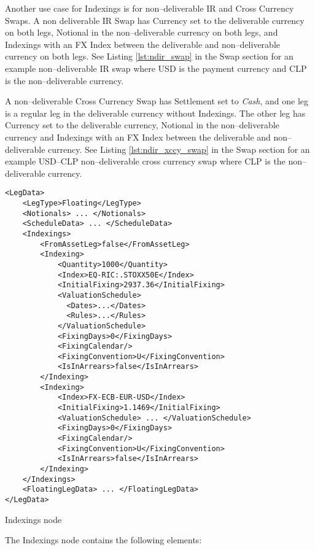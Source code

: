 Another use case for Indexings is for non–deliverable IR and Cross Currency Swaps. A non deliverable IR Swap has Currency set to the deliverable currency on both legs, Notional in the non–deliverable currency on both legs, and Indexings with an FX Index between the deliverable and non–deliverable currency on both legs. See Listing \ref{lst:ndir_swap} in the Swap section for an example non–deliverable IR swap where USD is the payment currency and CLP is the non–deliverable currency.

A non–deliverable Cross Currency Swap has Settlement set to \emph{Cash}, and one leg is a regular leg in the deliverable currency without Indexings. The other leg has Currency set to the deliverable currency, Notional in the non–deliverable currency and Indexings with an FX Index between the deliverable and non–deliverable currency. See Listing \ref{lst:ndir_xccy_swap} in the Swap section for an example USD–CLP non–deliverable cross currency swap where CLP is the non–deliverable currency.

\begin{listing}[H]
\begin{verbatim}
<LegData>
    <LegType>Floating</LegType>
    <Notionals> ... </Notionals>
    <ScheduleData> ... </ScheduleData>
    <Indexings>
        <FromAssetLeg>false</FromAssetLeg>
        <Indexing>
            <Quantity>1000</Quantity>
            <Index>EQ-RIC:.STOXX50E</Index>
            <InitialFixing>2937.36</InitialFixing>
            <ValuationSchedule>
              <Dates>...</Dates>
              <Rules>...</Rules>
            </ValuationSchedule>
            <FixingDays>0</FixingDays>
            <FixingCalendar/>
            <FixingConvention>U</FixingConvention>
            <IsInArrears>false</IsInArrears>
        </Indexing>
        <Indexing>
            <Index>FX-ECB-EUR-USD</Index>
            <InitialFixing>1.1469</InitialFixing>
            <ValuationSchedule> ... </ValuationSchedule>
            <FixingDays>0</FixingDays>
            <FixingCalendar/>
            <FixingConvention>U</FixingConvention>
            <IsInArrears>false</IsInArrears>
        </Indexing>
    </Indexings>
    <FloatingLegData> ... </FloatingLegData>
</LegData>
\end{verbatim}
\caption{Indexings node}
\label{lst:indexings}
\end{listing}

The Indexings node contains the following elements:

